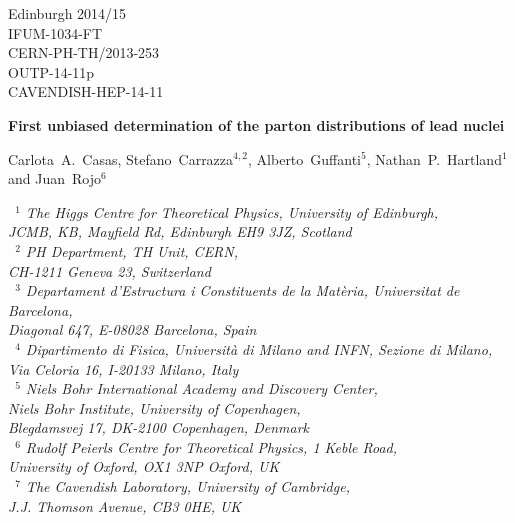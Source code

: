 \documentclass[11pt,a4paper]{article}
\begin{document}
\begin{figure}[h]
\end{figure}
\vspace{-2.0cm}
\begin{flushright}
Edinburgh 2014/15\\
IFUM-1034-FT\\
CERN-PH-TH/2013-253\\
OUTP-14-11p \\
CAVENDISH-HEP-14-11\\
\end{flushright}

\begin{center}
  {\Large \bf First unbiased determination of the parton distributions of lead nuclei}
\vspace{.7cm}


Carlota~A.~Casas, Stefano~Carrazza$^{4,2}$, Alberto~Guffanti$^{5}$, 
Nathan~P.~Hartland$^1$ and Juan~Rojo$^{6}$ 

\vspace{.3cm}
{\it ~$^1$ The Higgs Centre for Theoretical Physics, University of Edinburgh,\\
JCMB, KB, Mayfield Rd, Edinburgh EH9 3JZ, Scotland\\
~$^2$  PH Department, TH Unit, CERN,\\ CH-1211 Geneva 23, Switzerland\\
~$^3$ Departament d'Estructura i Constituents de la Mat\`eria, 
Universitat de Barcelona,\\ Diagonal 647, E-08028 Barcelona, Spain\\
~$^4$ Dipartimento di Fisica, Universit\`a di Milano and
INFN, Sezione di Milano,\\ Via Celoria 16, I-20133 Milano, Italy\\
~$^5$ Niels Bohr International Academy and Discovery Center, \\
Niels Bohr Institute,  University of Copenhagen, \\
Blegdamsvej 17, DK-2100 Copenhagen, Denmark\\
~$^6$ Rudolf Peierls Centre for Theoretical Physics, 1 Keble Road,\\ University of Oxford, OX1 3NP Oxford, UK\\
~$^7$ The Cavendish Laboratory, University of Cambridge,\\
J.J. Thomson Avenue, CB3 0HE, UK}
\end{center}   
\end{document}
